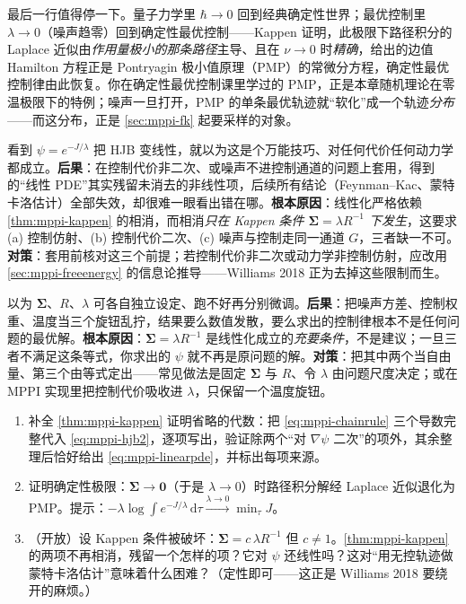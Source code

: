 \noindent 最后一行值得停一下。量子力学里 $\hbar\to0$ 回到经典确定性世界；最优控制里 $\lambda\to0$（噪声趋零）回到确定性最优控制——Kappen 证明，此极限下路径积分的 Laplace 近似由\emph{作用量极小的那条路径}主导、且在 $\nu\to0$ 时\emph{精确}，给出的边值 Hamilton 方程正是 Pontryagin 极小值原理（PMP）的常微分方程，确定性最优控制律由此恢复\cite{kappen2005path,kappen2005linear}。你在确定性最优控制课里学过的 PMP，正是本章随机理论在零温极限下的特例；噪声一旦打开，PMP 的单条最优轨迹就“软化”成一个轨迹\emph{分布}——而这分布，正是 \cref{sec:mppi-fk} 起要采样的对象。

\begin{pitfall}
看到 $\psi=e^{-J/\lambda}$ 把 HJB 变线性，就以为这是个万能技巧、对任何代价任何动力学都成立。\textbf{后果}：在控制代价非二次、或噪声不进控制通道的问题上套用，得到的“线性 PDE”其实残留未消去的非线性项，后续所有结论（Feynman--Kac、蒙特卡洛估计）全部失效，却很难一眼看出错在哪。\textbf{根本原因}：线性化严格依赖 \cref{thm:mppi-kappen} 的相消，而相消\emph{只在 Kappen 条件 $\boldsymbol{\Sigma}=\lambda R^{-1}$ 下发生}，这要求 (a) 控制仿射、(b) 控制代价二次、(c) 噪声与控制走同一通道 $G$，三者缺一不可。\textbf{对策}：套用前核对这三个前提；若控制代价非二次或动力学非控制仿射，应改用 \cref{sec:mppi-freeenergy} 的信息论推导——Williams 2018 正为去掉这些限制而生\cite{williams2018information}。
\end{pitfall}

\begin{pitfall}
以为 $\boldsymbol{\Sigma}$、$R$、$\lambda$ 可各自独立设定、跑不好再分别微调。\textbf{后果}：把噪声方差、控制权重、温度当三个旋钮乱拧，结果要么数值发散，要么求出的控制律根本不是任何问题的最优解。\textbf{根本原因}：$\boldsymbol{\Sigma}=\lambda R^{-1}$ 是线性化成立的\emph{充要条件}，不是建议；一旦三者不满足这条等式，你求出的 $\psi$ 就不再是原问题的解。\textbf{对策}：把其中两个当自由量、第三个由等式定出——常见做法是固定 $\boldsymbol{\Sigma}$ 与 $R$、令 $\lambda$ 由问题尺度决定；或在 MPPI 实现里把控制代价吸收进 $\lambda$，只保留一个温度旋钮。
\end{pitfall}

\begin{practice}
\begin{enumerate}
  \item 补全 \cref{thm:mppi-kappen} 证明省略的代数：把 \cref{eq:mppi-chainrule} 三个导数完整代入 \cref{eq:mppi-hjb2}，逐项写出，验证除两个“对 $\nabla\psi$ 二次”的项外，其余整理后恰好给出 \cref{eq:mppi-linearpde}，并标出每项来源。
  \item 证明确定性极限：$\boldsymbol{\Sigma}\to\mathbf{0}$（于是 $\lambda\to0$）时路径积分解经 Laplace 近似退化为 PMP。提示：$-\lambda\log\int e^{-J/\lambda}\,\mathrm{d}\tau\xrightarrow{\lambda\to0}\min_\tau J$。
  \item （开放）设 Kappen 条件被破坏：$\boldsymbol{\Sigma}=c\,\lambda R^{-1}$ 但 $c\neq1$。\cref{thm:mppi-kappen} 的两项不再相消，残留一个怎样的项？它对 $\psi$ 还线性吗？这对“用无控轨迹做蒙特卡洛估计”意味着什么困难？（定性即可——这正是 Williams 2018 要绕开的麻烦。）
\end{enumerate}
\end{practice}

